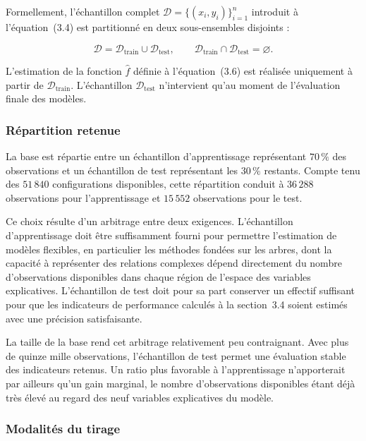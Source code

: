 Formellement, l'échantillon complet $\mathcal{D} = \{(x_i, y_i)\}_{i=1}^{n}$ introduit à l'équation~(3.4) est partitionné en deux sous-ensembles disjoints :

\begin{equation}
\mathcal{D} = \mathcal{D}_{\text{train}} \cup \mathcal{D}_{\text{test}}, 
\qquad 
\mathcal{D}_{\text{train}} \cap \mathcal{D}_{\text{test}} = \varnothing.
\label{eq:partition-base}
\end{equation}

L'estimation de la fonction $\hat{f}$ définie à l'équation~(3.6) est réalisée uniquement à partir de $\mathcal{D}_{\text{train}}$. L'échantillon $\mathcal{D}_{\text{test}}$ n'intervient qu'au moment de l'évaluation finale des modèles.

\subsubsection{Répartition retenue}

La base est répartie entre un échantillon d'apprentissage représentant $70\,\%$ des observations et un échantillon de test représentant les $30\,\%$ restants. Compte tenu des $51\,840$ configurations disponibles, cette répartition conduit à $36\,288$ observations pour l'apprentissage et $15\,552$ observations pour le test.

Ce choix résulte d'un arbitrage entre deux exigences. L'échantillon d'apprentissage doit être suffisamment fourni pour permettre l'estimation de modèles flexibles, en particulier les méthodes fondées sur les arbres, dont la capacité à représenter des relations complexes dépend directement du nombre d'observations disponibles dans chaque région de l'espace des variables explicatives. L'échantillon de test doit pour sa part conserver un effectif suffisant pour que les indicateurs de performance calculés à la section~3.4 soient estimés avec une précision satisfaisante.

La taille de la base rend cet arbitrage relativement peu contraignant. Avec plus de quinze mille observations, l'échantillon de test permet une évaluation stable des indicateurs retenus. Un ratio plus favorable à l'apprentissage n'apporterait par ailleurs qu'un gain marginal, le nombre d'observations disponibles étant déjà très élevé au regard des neuf variables explicatives du modèle.

\subsubsection{Modalités du tirage}

